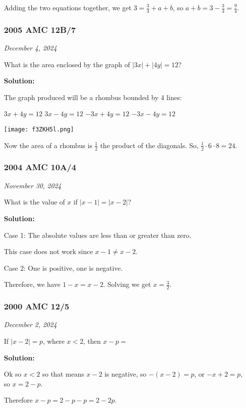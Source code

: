 \documentclass[../mathproblems.tex]{subfiles}
\begin{document}
Adding the two equations together, we get $3=\frac{3}{4}+a+b$, so $a+b = 3-\frac{3}{4} = \boxed{\frac{9}{4}}$.

\noindent\hrulefill



\subsubsection*{2005 AMC 12B/7} 
\textit{December 4, 2024}

What is the area enclosed by the graph of $|3x|+|4y|=12$?

\textbf{Solution:}

The graph produced will be a rhombus bounded by 4 lines:

$3x+4y=12$
$3x-4y =12$
$-3x+4y=12$
$-3x-4y=12$

\begin{center}
    \texttt{[image: f3ZKH5l.png]}
\end{center}

Now the area of a rhombus is $\frac{1}{2}$ the product of the diagonals. So, $\frac{1}{2}\cdot 6 \cdot 8 = \boxed{24}$.

\noindent\hrulefill
\subsubsection*{2004 AMC 10A/4} 
\textit{November 30, 2024}

What is the value of $x$ if $|x-1|=|x-2|$?

\textbf{Solution:}

Case 1: The absolute values are less than or greater than zero.

This case does not work since $x-1\neq x-2$.

Case 2: One is positive, one is negative.

Therefore, we have $1-x=x-2$. Solving we get $x=\boxed{\frac{3}{2}}$.

\noindent\hrulefill
\subsubsection*{2000 AMC 12/5} 
\textit{December 2, 2024}

If $|x - 2| = p$, where $x < 2$, then $x - p =$

\textbf{Solution:}

Ok so $x<2$ so that means $x-2$ is negative, so $-(x-2) = p$, or $-x+2 = p$, so $x=2-p$.

Therefore $x-p = 2-p-p = \boxed{2-2p}$.
\end{document}

